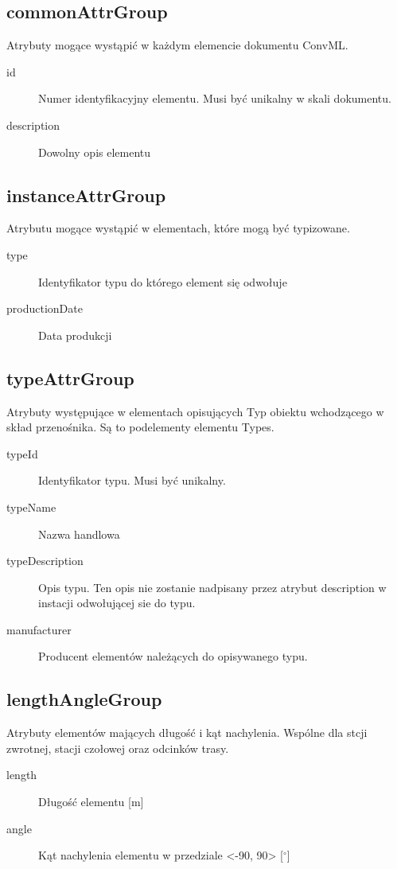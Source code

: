 \documentclass[12pt,a4paper]{article}
\begin{document}
\subsection{commonAttrGroup}
Atrybuty mogące wystąpić w każdym elemencie dokumentu ConvML.

\begin{description}
\item[id] Numer identyfikacyjny elementu. Musi być unikalny w skali dokumentu.
\item[description] Dowolny opis elementu
\end{description}

\subsection{instanceAttrGroup}
Atrybutu mogące wystąpić w elementach, które mogą być typizowane.

\begin{description}
\item[type] Identyfikator typu do którego element się odwołuje
\item[productionDate] Data produkcji 
\end{description}

\subsection{typeAttrGroup}
Atrybuty występujące w elementach opisujących Typ obiektu wchodzącego w skład
przenośnika. Są to podelementy elementu Types.

\begin{description}
\item[typeId] Identyfikator typu. Musi być unikalny.
\item[typeName] Nazwa handlowa
\item[typeDescription] Opis typu. Ten opis nie zostanie nadpisany przez atrybut description
	w instacji odwołującej sie do typu.
\item[manufacturer] Producent elementów należących do opisywanego typu. 
\end{description}

\subsection{lengthAngleGroup}
Atrybuty elementów mających długość i kąt nachylenia. Wspólne dla stcji zwrotnej, stacji czołowej
oraz odcinków trasy. 

\begin{description}
\item[length] Długość elementu [m]
\item[angle] Kąt nachylenia elementu w przedziale <-90, 90> [$^\circ$] 
\end{description}
\end{document}
